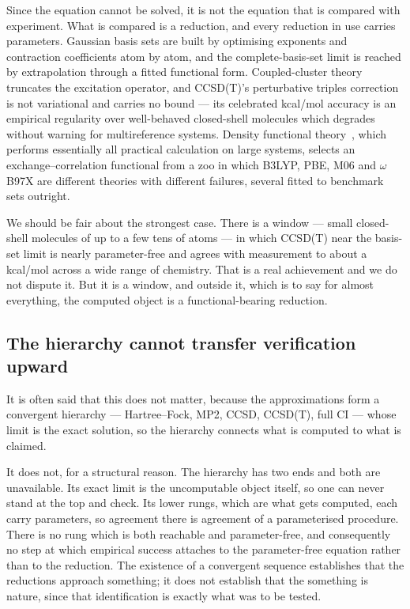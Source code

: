 \documentclass[11pt]{article}
\begin{document}
Since the equation cannot be solved, it is not the equation that is compared with experiment.
What is compared is a reduction, and every reduction in use carries parameters. Gaussian basis
sets are built by optimising exponents and contraction coefficients atom by atom, and the
complete-basis-set limit is reached by extrapolation through a fitted functional form.
Coupled-cluster theory~\cite{SzaboOstlund} truncates the excitation operator, and CCSD(T)'s
perturbative triples correction~\cite{Raghavachari1989} is not variational and carries no bound --- its celebrated kcal/mol accuracy is an
empirical regularity over well-behaved closed-shell molecules which degrades without warning for
multireference systems. Density functional theory~\cite{HK64,KS65}, which performs essentially all practical
calculation on large systems, selects an exchange--correlation functional from a zoo in which
B3LYP, PBE, M06 and $\omega$B97X are different theories with different failures, several fitted
to benchmark sets outright.

We should be fair about the strongest case. There is a window --- small closed-shell molecules of
up to a few tens of atoms --- in which CCSD(T) near the basis-set limit is nearly parameter-free
and agrees with measurement to about a kcal/mol across a wide range of chemistry. That is a real
achievement and we do not dispute it. But it is a window, and outside it, which is to say for
almost everything, the computed object is a functional-bearing reduction.

\subsection{The hierarchy cannot transfer verification upward}

It is often said that this does not matter, because the approximations form a convergent
hierarchy --- Hartree--Fock, MP2, CCSD, CCSD(T), full CI --- whose limit is the exact solution,
so the hierarchy connects what is computed to what is claimed.

It does not, for a structural reason. The hierarchy has two ends and both are unavailable. Its
exact limit is the uncomputable object itself, so one can never stand at the top and check. Its
lower rungs, which are what gets computed, each carry parameters, so agreement there is agreement
of a parameterised procedure. There is no rung which is both reachable and parameter-free, and
consequently no step at which empirical success attaches to the parameter-free equation rather
than to the reduction. The existence of a convergent sequence establishes that the reductions
approach something; it does not establish that the something is nature, since that identification
is exactly what was to be tested.
\end{document}
